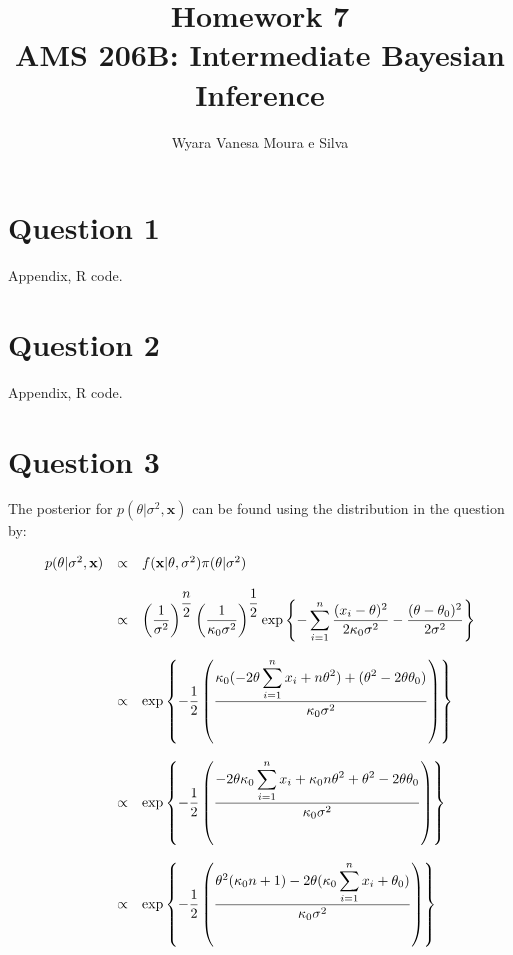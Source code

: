 \documentclass{article}
\begin{document}
\title{\textbf{Homework 7} \\ AMS 206B: Intermediate Bayesian Inference }
\author{Wyara Vanesa Moura e Silva}

\maketitle

\section{Question 1}

Appendix, R code.

\section{Question 2}

Appendix, R code.

\section{Question 3}

The posterior for $p(\theta|\sigma^2,\textbf{x})$ can be found using the distribution in the question by:

\begin{equation*}
\begin{array}{lcl ll }
p(\theta|\sigma^2,\textbf{x}) & \propto & f(\textbf{x}|\theta, \sigma^2) \pi(\theta|\sigma^2)\\ \\

& \propto & \left(\dfrac{1}{\sigma^2}\right)^{\dfrac{n}{2}} \left(\dfrac{1}{\kappa_0\sigma^2}\right)^{\dfrac{1}{2}} \mbox{exp}\left\{ - \displaystyle\sum_{i=1}^{n}\frac{(x_{i} - \theta)^2}{2\kappa_0\sigma^2} - \dfrac{(\theta - \theta_0)^2}{2\sigma^2} \right\} \\\\

& \propto & \mbox{exp}\left\{ - \dfrac{1}{2} \left(  \dfrac{\kappa_0(-2\theta\displaystyle\sum_{i=1}^{n}x_{i} + n\theta^2) + (\theta^2 - 2\theta\theta_0)}{\kappa_0\sigma^2} \right)\right\} \\\\

& \propto & \mbox{exp}\left\{ - \dfrac{1}{2} \left(  \dfrac{-2\theta\kappa_0\displaystyle\sum_{i=1}^{n}x_{i} + \kappa_0n\theta^2  + \theta^2 - 2\theta\theta_0}{\kappa_0\sigma^2} \right)\right\} \\\\

& \propto & \mbox{exp}\left\{ - \dfrac{1}{2} \left( \dfrac{\theta^2 (\kappa_0n + 1) -2\theta (\kappa_0\displaystyle\sum_{i=1}^{n}x_{i} + \theta_0)}{\kappa_0\sigma^2} \right)\right\} \\\\

 \end{array}
\end{equation*}
\end{document}
